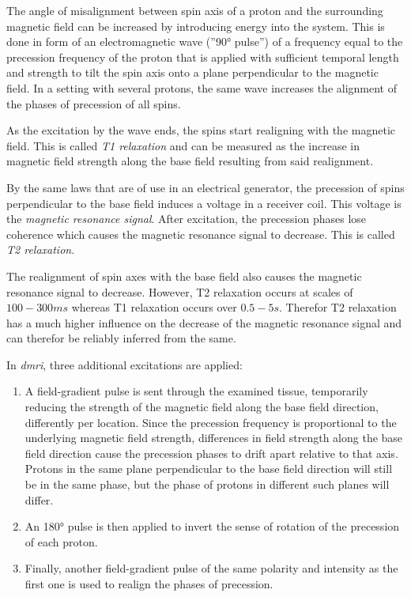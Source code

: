 \documentclass[plainreport]{cgvpub}
\begin{document}
	The angle of misalignment between spin axis of a proton and the surrounding magnetic field can be increased by introducing energy into the system. This is done in form of an electromagnetic wave (''90° pulse'') of a frequency equal to the precession frequency of the proton that is applied with sufficient temporal length and strength to tilt the spin axis onto a plane perpendicular to the magnetic field.  In a setting with several protons, the same wave increases the alignment of the phases of precession of all spins.
	
	As the excitation by the wave ends, the spins start realigning with the magnetic field. This is called \emph{T1 relaxation} and can be measured as the increase in magnetic field strength along the base  field resulting from said realignment. 
	
	By the same laws that are of use in an electrical generator, the precession of spins perpendicular to the base field induces a voltage in a receiver coil. This voltage is the \emph{magnetic resonance signal}. After excitation, the precession phases lose coherence which causes the magnetic resonance signal to decrease. This is called \emph{T2 relaxation}.
	
	The realignment of spin axes with the base field also causes the magnetic resonance signal to decrease. However, T2 relaxation occurs at scales of $ 100-300ms $ whereas T1 relaxation occurs over $ 0.5 - 5s $. Therefor T2 relaxation has a much higher influence on the decrease of the magnetic resonance signal and can therefor be reliably inferred from the same. 
	
	In \emph{\acrfull{dmri}}, three additional excitations are applied:
	\begin{enumerate}
		\item A field-gradient pulse is sent through the examined tissue, temporarily reducing the strength of the magnetic field along the base field direction, differently per location. Since the precession frequency is proportional to the underlying magnetic field strength, differences in field strength along the base field direction cause the precession phases to drift apart relative to that axis. Protons in the same plane perpendicular to the base field direction will still be in the same phase, but the phase of protons in different such planes will differ.
		\item An 180° pulse is then applied to invert the sense of rotation of the precession of each proton. 
		\item Finally, another field-gradient pulse of the same polarity and intensity as the first one is used to realign the phases of precession.
	\end{enumerate}
\end{document}
